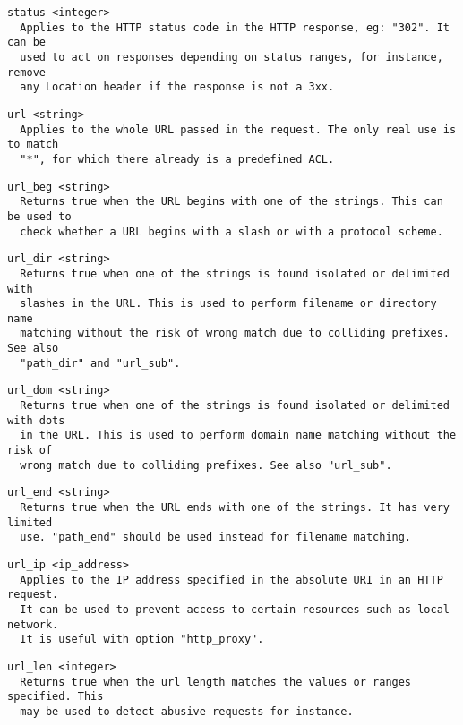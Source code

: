 \begin{verbatim}
status <integer>
  Applies to the HTTP status code in the HTTP response, eg: "302". It can be
  used to act on responses depending on status ranges, for instance, remove
  any Location header if the response is not a 3xx.
\end{verbatim}

\begin{verbatim}
url <string>
  Applies to the whole URL passed in the request. The only real use is to match
  "*", for which there already is a predefined ACL.
\end{verbatim}

\begin{verbatim}
url_beg <string>
  Returns true when the URL begins with one of the strings. This can be used to
  check whether a URL begins with a slash or with a protocol scheme.
\end{verbatim}

\begin{verbatim}
url_dir <string>
  Returns true when one of the strings is found isolated or delimited with
  slashes in the URL. This is used to perform filename or directory name
  matching without the risk of wrong match due to colliding prefixes. See also
  "path_dir" and "url_sub".
\end{verbatim}

\begin{verbatim}
url_dom <string>
  Returns true when one of the strings is found isolated or delimited with dots
  in the URL. This is used to perform domain name matching without the risk of
  wrong match due to colliding prefixes. See also "url_sub".
\end{verbatim}

\begin{verbatim}
url_end <string>
  Returns true when the URL ends with one of the strings. It has very limited
  use. "path_end" should be used instead for filename matching.
\end{verbatim}

\begin{verbatim}
url_ip <ip_address>
  Applies to the IP address specified in the absolute URI in an HTTP request.
  It can be used to prevent access to certain resources such as local network.
  It is useful with option "http_proxy".
\end{verbatim}

\begin{verbatim}
url_len <integer>
  Returns true when the url length matches the values or ranges specified. This
  may be used to detect abusive requests for instance.
\end{verbatim}

